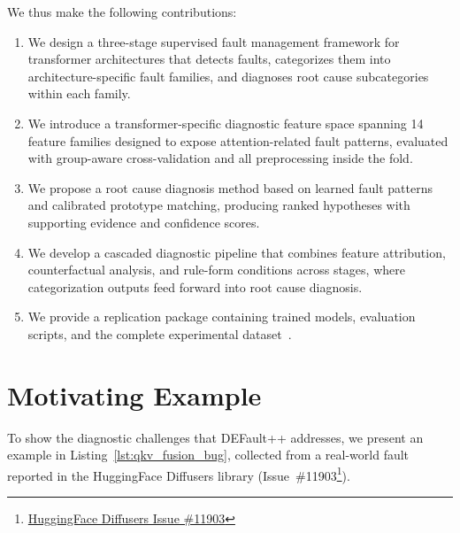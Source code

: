 We thus make the following contributions:

\begin{enumerate}[label=(\alph*)]
\item We design a three-stage supervised fault management framework for transformer architectures that detects faults, categorizes them into architecture-specific fault families, and diagnoses root cause subcategories within each family.

\item We introduce a transformer-specific diagnostic feature space spanning 14 feature families designed to expose attention-related fault patterns, evaluated with group-aware cross-validation and all preprocessing inside the fold.

\item We propose a root cause diagnosis method based on learned fault patterns and calibrated prototype matching, producing ranked hypotheses with supporting evidence and confidence scores.

\item We develop a cascaded diagnostic pipeline that combines feature attribution, counterfactual analysis, and rule-form conditions across stages, where categorization outputs feed forward into root cause diagnosis.

\item We provide a replication package containing trained models, evaluation scripts, and the complete experimental dataset~\cite{defaultpp_repo}.
\end{enumerate}

\section{Motivating Example}
\label{sec:defaultpp_motivation}

To show the diagnostic challenges that DEFault++ addresses, we present an example in Listing~\ref{lst:qkv_fusion_bug}, collected from a real-world fault reported in the HuggingFace Diffusers library (Issue~\#11903\footnote{\href{https://github.com/huggingface/diffusers/issues/11903}{HuggingFace Diffusers Issue \#11903}}).

